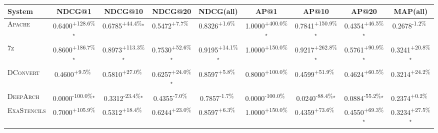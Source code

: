 \begin{table}[htbp]
\centering
\renewcommand{\arraystretch}{1.2}
\begin{tabular}{l|cccc|cccc}
\hline
System & NDCG@1 & NDCG@10 & NDCG@20 & NDCG(all) & AP@1 & AP@10 & AP@20 & MAP(all) \\ \hline
\textsc{Apache} & \cellcolor{green!30}0.6400\textsuperscript{+128.6\%}$^\star$ & \cellcolor{green!30}0.6785\textsuperscript{+44.4\%}$^\star$ & \cellcolor{green!30}0.5472\textsuperscript{+7.7\%}$^{\,\,\,}$ & \cellcolor{green!30}0.8326\textsuperscript{+1.6\%}$^{\,\,\,}$ & \cellcolor{green!30}1.0000\textsuperscript{+400.0\%}$^\star$ & \cellcolor{green!30}0.7841\textsuperscript{+150.9\%}$^\star$ & \cellcolor{green!30}0.4354\textsuperscript{+46.5\%}$^\star$ & \cellcolor{red!30}0.2678\textsuperscript{-1.2\%}$^{\,\,\,}$ \\
\textsc{7z} & \cellcolor{green!30}0.8600\textsuperscript{+186.7\%}$^\star$ & \cellcolor{green!30}0.8973\textsuperscript{+113.3\%}$^\star$ & \cellcolor{green!30}0.7530\textsuperscript{+52.6\%}$^\star$ & \cellcolor{green!30}0.9195\textsuperscript{+14.1\%}$^\star$ & \cellcolor{green!30}1.0000\textsuperscript{+150.0\%}$^{\,\,\,}$ & \cellcolor{green!30}0.9217\textsuperscript{+262.8\%}$^\star$ & \cellcolor{green!30}0.5761\textsuperscript{+90.9\%}$^\star$ & \cellcolor{green!30}0.3241\textsuperscript{+20.8\%}$^\star$ \\
\textsc{DConvert} & \cellcolor{green!30}0.4600\textsuperscript{+9.5\%}$^{\,\,\,}$ & \cellcolor{green!30}0.5810\textsuperscript{+27.0\%}$^{\,\,\,}$ & \cellcolor{green!30}0.6257\textsuperscript{+24.0\%}$^\star$ & \cellcolor{green!30}0.8597\textsuperscript{+5.8\%}$^{\,\,\,}$ & \cellcolor{green!30}0.8000\textsuperscript{+100.0\%}$^{\,\,\,}$ & \cellcolor{green!30}0.4599\textsuperscript{+51.9\%}$^{\,\,\,}$ & \cellcolor{green!30}0.4624\textsuperscript{+60.5\%}$^{\,\,\,}$ & \cellcolor{green!30}0.3214\textsuperscript{+24.2\%}$^{\,\,\,}$ \\
\textsc{DeepArch} & \cellcolor{red!30}0.0000\textsuperscript{-100.0\%}$^\star$ & \cellcolor{red!30}0.3312\textsuperscript{-23.4\%}$^\star$ & \cellcolor{red!30}0.4355\textsuperscript{-7.0\%}$^{\,\,\,}$ & \cellcolor{red!30}0.7857\textsuperscript{-1.7\%}$^{\,\,\,}$ & \cellcolor{red!30}0.0000\textsuperscript{-100.0\%}$^{\,\,\,}$ & \cellcolor{red!30}0.0240\textsuperscript{-88.4\%}$^\star$ & \cellcolor{red!30}0.0884\textsuperscript{-55.2\%}$^\star$ & \cellcolor{green!30}0.2374\textsuperscript{+0.2\%}$^{\,\,\,}$ \\
\textsc{ExaStencils} & \cellcolor{green!30}0.7000\textsuperscript{+105.9\%}$^{\,\,\,}$ & \cellcolor{green!30}0.5312\textsuperscript{+18.4\%}$^{\,\,\,}$ & \cellcolor{green!30}0.6244\textsuperscript{+23.0\%}$^{\,\,\,}$ & \cellcolor{green!30}0.8597\textsuperscript{+6.3\%}$^{\,\,\,}$ & \cellcolor{green!30}1.0000\textsuperscript{+150.0\%}$^{\,\,\,}$ & \cellcolor{green!30}0.4359\textsuperscript{+73.6\%}$^{\,\,\,}$ & \cellcolor{green!30}0.4550\textsuperscript{+69.3\%}$^\star$ & \cellcolor{green!30}0.3234\textsuperscript{+27.5\%}$^\star$ \\

\end{tabular}
\end{table}
